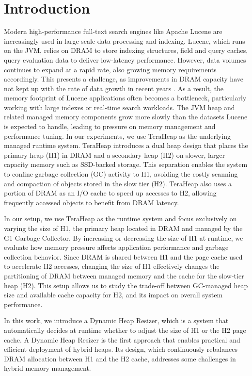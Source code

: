 \section{Introduction}
Modern high-performance full-text search engines like Apache Lucene \cite{lucene} are increasingly used in large-scale data processing and indexing. Lucene, which runs on the JVM, relies on DRAM to store indexing structures, field and query caches, query evaluation data to deliver low-latency performance. However, data volumes continues to expand at a rapid rate, also growing memory requirements accordingly. This presents a challenge, as improvements in DRAM capacity have not kept up with the rate of data growth in recent years \cite{DAOS, Borg}. As a result, the memory footprint of Lucene applications often becomes a bottleneck, particularly working with large indexes or real-time search workloads. The JVM heap and related managed memory components grow more slowly than the datasets Lucene is expected to handle, leading to pressure on memory management and performance tuning. In our experiments, we use TeraHeap as the underlying managed runtime system. TeraHeap introduces a dual heap design that places the primary heap (H1) in DRAM and a secondary heap (H2) on slower, larger-capacity memory such as SSD-backed storage. This separation enables the system to confine garbage collection (GC) activity to H1, avoiding the costly scanning and compaction of objects stored in the slow tier (H2). TeraHeap also uses a portion of DRAM as an I/O cache to speed up accesses to H2, allowing frequently accessed objects to benefit from DRAM latency.

In our setup, we use TeraHeap \cite{TeraHeap} as the runtime system and focus exclusively on varying the size of H1, the primary heap located in DRAM and managed by the G1 Garbage Collector. By increasing or decreasing the size of H1 at runtime, we evaluate how memory pressure affects application performance and garbage collection behavior. Since DRAM is shared between H1 and the page cache used to accelerate H2 accesses, changing the size of H1 effectively changes the partitioning of DRAM between managed memory and the cache for the slow-tier heap (H2). This setup allows us to study the trade-off between GC-managed heap size and available cache capacity for H2, and its impact on overall system performance.

In this work, we introduce a Dynamic Heap Resizer, which is a system that automatically decides at runtime whether to adjust the size of H1 or the H2 page cache. A Dynamic Heap Resizer is the first approach that enables practical and efficient deployment of hybrid heaps. Its design, which continuously rebalances DRAM allocation between H1 and the H2 cache, addresses some challenges in hybrid memory management.

